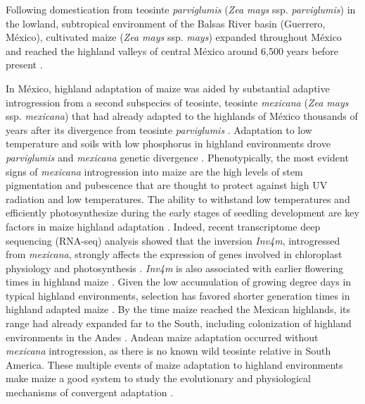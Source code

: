 \documentclass[9pt,twocolumn,twoside,lineno]{biorxiv}
\begin{document}
Following domestication from teosinte \textit{parviglumis} (\textit{Zea mays} ssp. \textit{parviglumis}) \cite{Matsuoka2002-bg,Piperno2009-fj} in the lowland, subtropical environment of the Balsas River basin (Guerrero, México), cultivated maize (\textit{Zea mays} ssp. \textit{mays}) expanded throughout México and reached the highland valleys of central México around 6,500 years before present \cite{Piperno2001-ea}.

In México, highland adaptation of maize was aided by substantial adaptive introgression from a second subspecies of teosinte, teosinte \textit{mexicana} (\textit{Zea mays} ssp. \textit{mexicana}) that had already adapted to the highlands of México thousands of years after its divergence from teosinte \textit{parviglumis} \cite{Hufford2013-gs, Gonzalez-Segovia2019-jy}. 
Adaptation to low temperature and soils with low phosphorus in highland environments drove \textit{parviglumis} and \textit{mexicana} genetic divergence \cite{AguirreLiguori2019-fl}.
Phenotypically, the most evident signs of \textit{mexicana} introgression into maize are the high levels of stem pigmentation and pubescence \cite{Lauter2004-eq} that are thought to protect against high UV radiation and low temperatures. 
The ability to withstand low temperatures and efficiently photosynthesize during the early stages of seedling development are key factors in maize highland adaptation \cite{Hardacre1980-tq}.
Indeed, recent transcriptome deep sequencing (RNA-seq) analysis showed that the inversion \textit{Inv4m}, introgressed from \textit{mexicana}, strongly affects the expression of genes involved in chloroplast physiology and photosynthesis \cite{Crow2020-gene}.  
\textit{Inv4m} is also associated with earlier flowering times in highland maize \cite{Romero_Navarro2017-cn, Gates2019-xu}. 
Given the low accumulation of growing degree days in typical highland environments, selection has favored shorter generation  times in highland adapted maize \cite{Gates2019-xu}.
By the time maize reached the Mexican highlands, its range had already expanded far to the South, including colonization of highland environments in the  Andes \cite{Athens2016-ep, Grobman2012-pm}. 
Andean maize adaptation occurred without \textit{mexicana} introgression, as there is no known wild teosinte relative in South America.
These multiple events of maize adaptation to highland environments make maize a good system to study the evolutionary and physiological mechanisms of convergent adaptation \cite{Takuno2015-uj, Wang2020-mp}.
\end{document}
